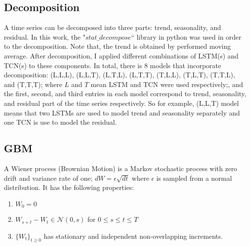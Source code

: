 \documentclass[12pt, A4]{article}
\begin{document}
\subsection{Decomposition}
A time series can be decomposed into three parts: trend, seasonality, and residual. In this work, the "$stat\_decompose$`` library in python was used in order to the decomposition. Note that, the trend is obtained by performed moving average. After decomposition, I applied different combinations of LSTM(s) and TCN(s) to these components. In total, there is $8$ models that incorporate decomposition: (L,L,L), (L,L,T), (L,T,L), (L,T,T), (T,L,L), (T,L,T), (T,T,L), and (T,T,T); where $L$ and $T$ mean LSTM  and TCN were used respectively;, and the first, second, and third entries in each model correspond to trend, seasonality, and residual part of the time series respectively. So for example, (L,L,T) model means that two LSTMs are used to model trend and seasonality separately and one TCN is use to model the residual. \\

\subsection{GBM}

A Wiener process (Brownian Motion) is a Markov stochastic process with zero drift and variance rate of one; $dW = \epsilon \sqrt{dt}$ where $\epsilon$ is sampled from a normal distribution. It has the following properties:
\begin{enumerate}
	\item $W_{0}=0$
	\item $W_{s+t}-W_{t} \in \mathcal{N}(0,s)$ for $0\leq s\leq t \leq T$
	\item $\{W_{t}\}_{t\geq 0}$ has stationary and independent non-overlapping increments. 
\end{enumerate}
 
\end{document}
